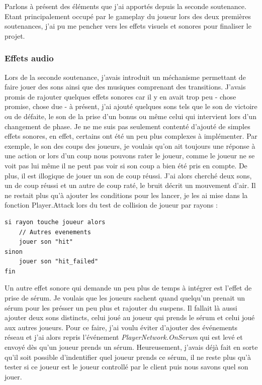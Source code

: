 \documentclass{article}
\begin{document}
Parlons à présent des éléments que j'ai apportés depuis la seconde soutenance.
Etant principalement occupé par le gameplay du joueur lors des deux premières soutenances, j'ai pu me pencher vers les effets visuels et sonores pour finaliser le projet.

\subsubsection{Effets audio}

Lors de la seconde soutenance, j'avais introduit un méchanisme permettant de faire jouer des sons ainsi que des musiques comprenant des transitions. J'avais promis de rajouter quelques effets sonores car il y en avait trop peu - chose promise, chose due - à présent, j'ai ajouté quelques sons tels que le son de victoire ou de défaite, le son de la prise d'un bonus ou même celui qui intervient lors d'un changement de phase. Je ne me suis pas seulement contenté d'ajouté de simples effets sonores, en effet, certains ont été un peu plus complexes à implémenter. Par exemple, le son des coups des joueurs, je voulais qu'on ait toujours une réponse à une action or lors d'un coup nous pouvons rater le joueur, comme le joueur ne se voit pas lui même il ne peut pas voir si son coup a bien été pris en compte. De plus, il est illogique de jouer un son de coup réussi. J'ai alors cherché deux sons, un de coup réussi et un autre de coup raté, le bruit décrit un mouvement d'air. Il ne restait plus qu'à ajouter les conditions pour les lancer, je les ai mise dans la fonction Player.Attack lors du test de collision de joueur par rayons :

\begin{lstlisting}
si rayon touche joueur alors
    // Autres evenements
    jouer son "hit"
sinon
    jouer son "hit_failed"
fin
\end{lstlisting}

Un autre effet sonore qui demande un peu plus de temps à intégrer est l'effet de prise de sérum. Je voulais que les joueurs sachent quand quelqu'un prenait un sérum pour les présser un peu plus et rajouter du suspens. Il fallait là aussi ajouter deux sons distincts, celui joué au joueur qui prends le sérum et celui joué aux autres joueurs. Pour ce faire, j'ai voulu éviter d'ajouter des événements réseau et j'ai alors repris l'événement \emph{PlayerNetwork.OnSerum} qui est levé et envoyé dès qu'un joueur prends un sérum. Heureusement, j'avais déjà fait en sorte qu'il soit possible d'indentifier quel joueur prends ce sérum, il ne reste plus qu'à tester si ce joueur est le joueur controllé par le client puis nous savons quel son jouer.
\end{document}
